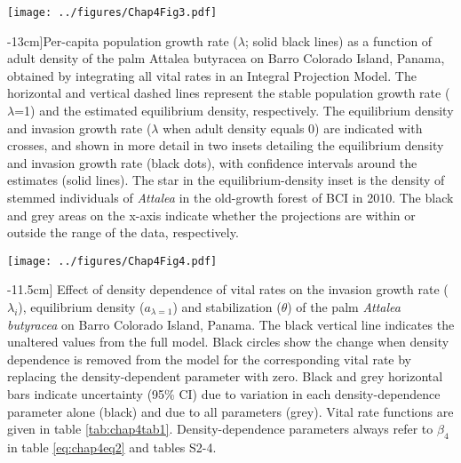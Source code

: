 \documentclass[b5paper,justified]{tufte-book} %
\begin{document}
\begin{fullwidth}
\begin{landscape}
\begin{figure*}
\hspace*{2.9cm}\texttt{[image: ../figures/Chap4Fig3.pdf]}
\caption[Per-capita population growth rate as a function of adult density][-13cm]{Per-capita population growth rate ($\lambda$; solid black lines) as a function of adult density of the palm Attalea butyracea on Barro Colorado Island, Panama, obtained by integrating all vital rates in an Integral Projection Model. The horizontal and vertical dashed lines represent the stable population growth rate ($\lambda$=1) and the estimated equilibrium density, respectively. The equilibrium density and invasion growth rate ($\lambda$ when adult density equals 0) are indicated with crosses, and shown in more detail in two insets detailing the equilibrium density and invasion growth rate (black dots), with confidence intervals around the estimates (solid lines). The star in the equilibrium-density inset is the density of stemmed individuals of \textit{Attalea} in the old-growth forest of BCI in 2010.  The black and grey areas on the x-axis indicate whether the projections are within or outside the range of the data, respectively.}
\label{fig:chap4fig3}
\end{figure*}
\end{landscape}


\begin{landscape}
\begin{figure*}
\hspace*{2.75cm} \texttt{[image: ../figures/Chap4Fig4.pdf]}
\caption[ Effect of density dependence of vital rates on the invasion growth rate ($\lambda_i$)][-11.5cm]{ Effect of density dependence of vital rates on the invasion growth rate ($\lambda_i$), equilibrium density ($a_{\lambda=1}$) and stabilization ($\theta$) of the palm \textit{Attalea butyracea} on Barro Colorado Island, Panama. The black vertical line indicates the unaltered values from the full model. Black circles show the change when density dependence is removed from the model for the corresponding vital rate by replacing the density-dependent parameter with zero. Black and grey horizontal bars indicate uncertainty (95\% CI) due to variation in each density-dependence parameter alone (black) and due to all parameters (grey). Vital rate functions are given in table \ref{tab:chap4tab1}. Density-dependence parameters always refer to $\beta_4$ in table \ref{eq:chap4eq2} and tables S2-4.}
\label{fig:chap4fig4}
\end{figure*}
\end{landscape}


\end{fullwidth}
\end{document}

